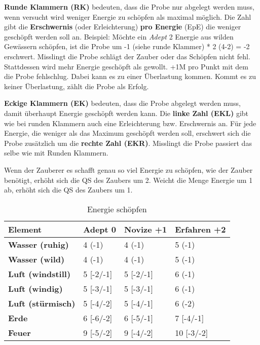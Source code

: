 \textbf{Runde Klammern (RK)} bedeuten, dass die Probe nur abgelegt werden muss, wenn versucht wird weniger Energie zu schöpfen als maximal möglich. Die Zahl gibt die \textbf{Erschwernis} (oder Erleichterung) \textbf{pro Energie} (EpE) die weniger geschöpft werden soll an. Beispiel: Möchte ein \textit{Adept} 2 Energie aus wilden Gewässern schöpfen, ist die Probe um -1 (siehe runde Klammer) * 2 (4-2) = -2 erschwert. Misslingt die Probe schlägt der Zauber oder das Schöpfen nicht fehl. Stattdessen wird mehr Energie geschöpft als gewollt. +1M pro Punkt mit dem die Probe fehlschlug. Dabei kann es zu einer Überlastung kommen. Kommt es zu keiner Überlastung, zählt die Probe als Erfolg.

\textbf{Eckige Klammern (EK)} bedeuten, dass die Probe abgelegt werden muss, damit überhaupt Energie geschöpft werden kann. Die \textbf{linke Zahl (EKL)} gibt wie bei runden Klammern auch eine Erleichterung bzw. Erschwernis an. Für jede Energie, die weniger als das Maximum geschöpft werden soll, erschwert sich die Probe zusätzlich um die \textbf{rechte Zahl (EKR)}. Misslingt die Probe passiert das selbe wie mit Runden Klammern.

Wenn der Zauberer es schafft genau so viel Energie zu schöpfen, wie der Zauber benötigt, erhöht sich die QS des Zaubers um 2. Weicht die Menge Energie um 1 ab, erhöht sich die QS des Zaubers um 1.

\begin{table}[H]
\begin{center}
\begin{tabular}{|l|l|l|l|}
\hline
\textbf{Element} & \textbf{Adept 0} & \textbf{Novize +1} & \textbf{Erfahren +2} \\ \hline
\textbf{Wasser (ruhig)} & 4 (-1) & 4 (-1) & 5 (-1) \\ \hline
\textbf{Wasser (wild)} & 4 (-1) & 4 (-1) & 5 (-1) \\ \hline
\textbf{Luft (windstill)} & 5 [-2/-1] & 5 [-2/-1] & 6 (-1) \\ \hline
\textbf{Luft (windig)} & 5 [-3/-1] & 5 [-3/-1] & 6 (-1) \\ \hline
\textbf{Luft (stürmisch)} & 5 [-4/-2] & 5 [-4/-1] & 6 (-2) \\ \hline
\textbf{Erde} & 6 [-6/-2] & 6 [-5/-1] & 7 [-4/-1] \\ \hline
\textbf{Feuer} & 9 [-5/-2] & 9 [-4/-2] & 10 [-3/-2] \\ \hline

\end{tabular}
\end{center}
\caption{Energie schöpfen}
\label{tab:energie_schoepfen}
\end{table}

